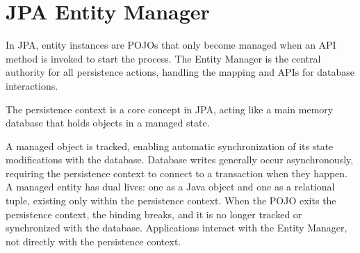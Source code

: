 \section{JPA Entity Manager}

In JPA, entity instances are POJOs that only become managed when an API method is invoked to start the process. 
The Entity Manager is the central authority for all persistence actions, handling the mapping and APIs for database interactions.
\begin{definition}
    The persistence context is a core concept in JPA, acting like a main memory database that holds objects in a managed state.
\end{definition}
A managed object is tracked, enabling automatic synchronization of its state modifications with the database. 
Database writes generally occur asynchronously, requiring the persistence context to connect to a transaction when they happen. 
A managed entity has dual lives: one as a Java object and one as a relational tuple, existing only within the persistence context. 
When the POJO exits the persistence context, the binding breaks, and it is no longer tracked or synchronized with the database.
Applications interact with the Entity Manager, not directly with the persistence context.

